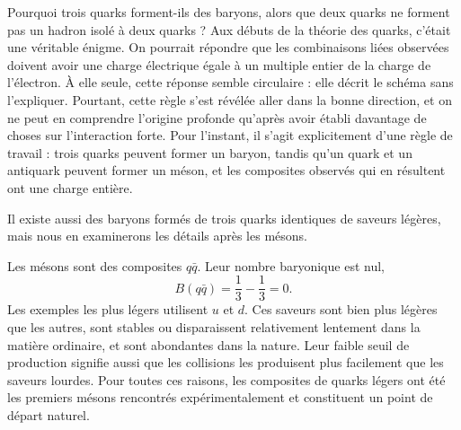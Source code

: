 \begin{classroomqa}
\end{classroomqa}

\begin{classroomqa}
\end{classroomqa}

Pourquoi trois quarks forment-ils des baryons, alors que deux quarks ne forment pas un hadron isolé à deux quarks ? Aux débuts de la théorie des quarks, c’était une véritable énigme. On pourrait répondre que les combinaisons liées observées doivent avoir une charge électrique égale à un multiple entier de la charge de l’électron. À elle seule, cette réponse semble circulaire : elle décrit le schéma sans l’expliquer. Pourtant, cette règle s’est révélée aller dans la bonne direction, et on ne peut en comprendre l’origine profonde qu’après avoir établi davantage de choses sur l’interaction forte. Pour l’instant, il s’agit explicitement d’une règle de travail : trois quarks peuvent former un baryon, tandis qu’un quark et un antiquark peuvent former un méson, et les composites observés qui en résultent ont une charge entière.

Il existe aussi des baryons formés de trois quarks identiques de saveurs légères, mais nous en examinerons les détails après les mésons.

Les mésons sont des composites \(q\bar q\). Leur nombre baryonique est nul,
\begin{equation}
B(q\bar q)=\frac13-\frac13=0.
\end{equation}
Les exemples les plus légers utilisent \(u\) et \(d\). Ces saveurs sont bien plus légères que les autres, sont stables ou disparaissent relativement lentement dans la matière ordinaire, et sont abondantes dans la nature. Leur faible seuil de production signifie aussi que les collisions les produisent plus facilement que les saveurs lourdes. Pour toutes ces raisons, les composites de quarks légers ont été les premiers mésons rencontrés expérimentalement et constituent un point de départ naturel.

